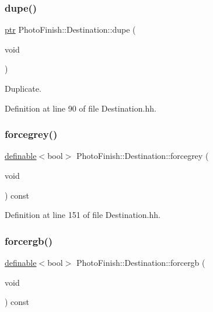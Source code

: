 \subsubsection{\texorpdfstring{dupe()}{dupe()}}
{\footnotesize\ttfamily \hyperlink{class_photo_finish_1_1_destination_a0d282a905cd81c3f0e6d7233c9bc7774}{ptr} Photo\+Finish\+::\+Destination\+::dupe (\begin{DoxyParamCaption}\item[{void}]{ }\end{DoxyParamCaption})\hspace{0.3cm}{\ttfamily [inline]}}



Duplicate. 



Definition at line 90 of file Destination.\+hh.

\mbox{\label{class_photo_finish_1_1_destination_a8898f99d52ebd9d25c1b0f7662147a28}} 
\subsubsection{\texorpdfstring{forcegrey()}{forcegrey()}}
{\footnotesize\ttfamily \hyperlink{class_photo_finish_1_1definable}{definable}$<$bool$>$ Photo\+Finish\+::\+Destination\+::forcegrey (\begin{DoxyParamCaption}\item[{void}]{ }\end{DoxyParamCaption}) const\hspace{0.3cm}{\ttfamily [inline]}}



Definition at line 151 of file Destination.\+hh.

\mbox{\label{class_photo_finish_1_1_destination_a6a66e2c4a6009ae787dbabf0cca5f724}} 
\subsubsection{\texorpdfstring{forcergb()}{forcergb()}}
{\footnotesize\ttfamily \hyperlink{class_photo_finish_1_1definable}{definable}$<$bool$>$ Photo\+Finish\+::\+Destination\+::forcergb (\begin{DoxyParamCaption}\item[{void}]{ }\end{DoxyParamCaption}) const\hspace{0.3cm}{\ttfamily [inline]}}



